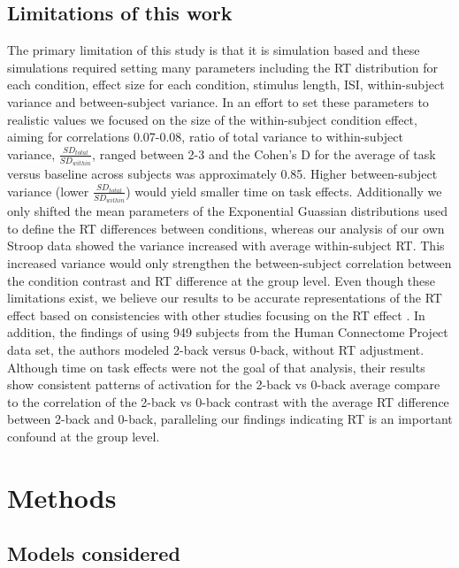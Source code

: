 \documentclass[titlepage,12pt] {article}
\begin{document}
\subsection*{Limitations of this work}
The primary limitation of this study is that it is simulation based and these simulations required setting many parameters including the RT distribution for each condition, effect size for each condition, stimulus length, ISI,  within-subject variance and between-subject variance.  In an effort to set these parameters to realistic values we focused on the size of the within-subject condition effect, aiming for correlations 0.07-0.08, ratio of total variance to within-subject variance, $\frac{SD_{total}}{SD_{within}}$,  ranged between 2-3 and the Cohen's D for the average of task versus baseline across subjects was approximately 0.85.  Higher between-subject variance (lower $\frac{SD_{total}}{SD_{within}}$) would yield smaller time on task effects.  Additionally we only shifted the mean parameters of the Exponential Guassian distributions used to define the RT differences between conditions, whereas our analysis of our own Stroop data showed the variance increased with average within-subject RT.  This increased variance would only strengthen the between-subject correlation between the condition contrast and RT difference at the group level.   Even though these limitations exist, we believe our results to be accurate representations of the RT effect based on consistencies with other studies focusing on the RT effect \citep{yarkoni_bold_2009, brown_medial_2011, grinband_dorsal_2011}.  In addition, the findings of \citet{li_neural_2021} using 949 subjects from the Human Connectome Project data set, the authors modeled 2-back versus 0-back, without RT adjustment.  Although time on task effects were not the goal of that analysis, their results show consistent patterns of activation for the 2-back vs 0-back average compare to the correlation of the 2-back vs 0-back contrast with the average RT difference between 2-back and 0-back, paralleling our findings indicating RT is an important confound at the group level.  


\section*{Methods}

\subsection*{Models considered}
\end{document}
